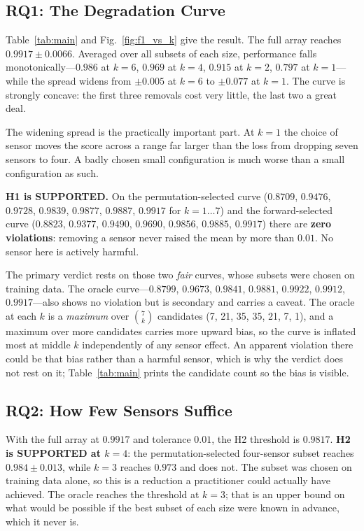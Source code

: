 \documentclass[conference]{IEEEtran}
\begin{document}
\subsection{RQ1: The Degradation Curve}

Table~\ref{tab:main} and Fig.~\ref{fig:f1_vs_k} give the result. The full array
reaches $0.9917 \pm 0.0066$. Averaged over all subsets of each size,
performance falls monotonically---$0.986$ at $k=6$, $0.969$ at $k=4$, $0.915$
at $k=2$, $0.797$ at $k=1$---while the spread widens from $\pm0.005$ at $k=6$
to $\pm0.077$ at $k=1$. The curve is strongly concave: the first three removals
cost very little, the last two a great deal.

The widening spread is the practically important part. At $k=1$ the choice of
sensor moves the score across a range far larger than the loss from dropping
seven sensors to four. A badly chosen small configuration is much worse than a
small configuration as such.

\textbf{H1 is SUPPORTED.} On the permutation-selected curve ($0.8709$,
$0.9476$, $0.9728$, $0.9839$, $0.9877$, $0.9887$, $0.9917$ for $k=1\ldots7$)
and the forward-selected curve ($0.8823$, $0.9377$, $0.9490$, $0.9690$,
$0.9856$, $0.9885$, $0.9917$) there are \textbf{zero violations}: removing a
sensor never raised the mean by more than $0.01$. No sensor here is actively
harmful.

The primary verdict rests on those two \emph{fair} curves, whose subsets were
chosen on training data. The oracle curve---$0.8799$, $0.9673$, $0.9841$,
$0.9881$, $0.9922$, $0.9912$, $0.9917$---also shows no violation but is
secondary and carries a caveat. The oracle at each $k$ is a \emph{maximum} over
$\binom{7}{k}$ candidates (7, 21, 35, 35, 21, 7, 1), and a maximum over more
candidates carries more upward bias, so the curve is inflated most at middle
$k$ independently of any sensor effect. An apparent violation there could be
that bias rather than a harmful sensor, which is why the verdict does not rest
on it; Table~\ref{tab:main} prints the candidate count so the bias is visible.

\subsection{RQ2: How Few Sensors Suffice}
\label{sec:rq2}

With the full array at $0.9917$ and tolerance $0.01$, the H2 threshold is
$0.9817$. \textbf{H2 is SUPPORTED at $k=4$}: the permutation-selected
four-sensor subset reaches $0.984 \pm 0.013$, while $k=3$ reaches $0.973$ and
does not. The subset was chosen on training data alone, so this is a reduction
a practitioner could actually have achieved. The oracle reaches the threshold
at $k=3$; that is an upper bound on what would be possible if the best subset
of each size were known in advance, which it never is.
\end{document}

